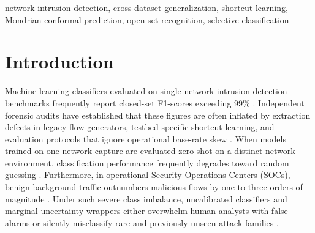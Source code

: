 ﻿\documentclass[conference]{IEEEtran}
\begin{document}
\begin{IEEEkeywords}
network intrusion detection, cross-dataset generalization, shortcut learning, Mondrian conformal prediction, open-set recognition, selective classification
\end{IEEEkeywords}

\section{Introduction}
Machine learning classifiers evaluated on single-network intrusion detection benchmarks frequently report closed-set F1-scores exceeding 99\% \cite{b1,b2}. Independent forensic audits have established that these figures are often inflated by extraction defects in legacy flow generators, testbed-specific shortcut learning, and evaluation protocols that ignore operational base-rate skew \cite{b1,b3,b4,b5}. When models trained on one network capture are evaluated zero-shot on a distinct network environment, classification performance frequently degrades toward random guessing \cite{b6,b7}. Furthermore, in operational Security Operations Centers (SOCs), benign background traffic outnumbers malicious flows by one to three orders of magnitude \cite{b2}. Under such severe class imbalance, uncalibrated classifiers and marginal uncertainty wrappers either overwhelm human analysts with false alarms or silently misclassify rare and previously unseen attack families \cite{b1,b8}.
\end{document}
